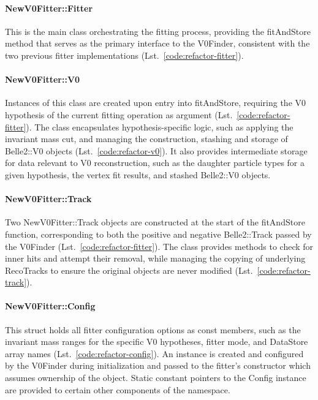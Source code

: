 \paragraph{NewV0Fitter::Fitter}
This is the main class orchestrating the fitting process, providing the fitAndStore method that serves as the primary interface to the V0Finder, consistent with the two previous fitter implementations (Lst.\ \ref{code:refactor-fitter}).

\paragraph{NewV0Fitter::V0}
Instances of this class are created upon entry into fitAndStore, requiring the V0 hypothesis of the current fitting operation as argument (Lst.\ \ref{code:refactor-fitter}).
The class encapsulates hypothesis-specific logic, such as applying the invariant mass cut, and managing the construction, stashing and storage of Belle2::V0 objects (Lst.\ \ref{code:refactor-v0}).
It also provides intermediate storage for data relevant to V0 reconstruction, such as the daughter particle types for a given hypothesis, the vertex fit results, and stashed Belle2::V0 objects.

\paragraph{NewV0Fitter::Track}
Two NewV0Fitter::Track objects are constructed at the start of the fitAndStore function, corresponding to both the positive and negative Belle2::Track passed by the V0Finder (Lst.\ \ref{code:refactor-fitter}).
The class provides methods to check for inner hits and attempt their removal, while managing the copying of underlying RecoTracks to ensure the original objects are never modified (Lst.\ \ref{code:refactor-track}).

\paragraph{NewV0Fitter::Config}
This struct holds all fitter configuration options as const members, such as the invariant mass ranges for the specific V0 hypotheses, fitter mode, and DataStore array names (Lst.\ \ref{code:refactor-config}).
An instance is created and configured by the V0Finder during initialization and passed to the fitter's constructor which assumes ownership of the object.
Static constant pointers to the Config instance are provided to certain other components of the namespace.

